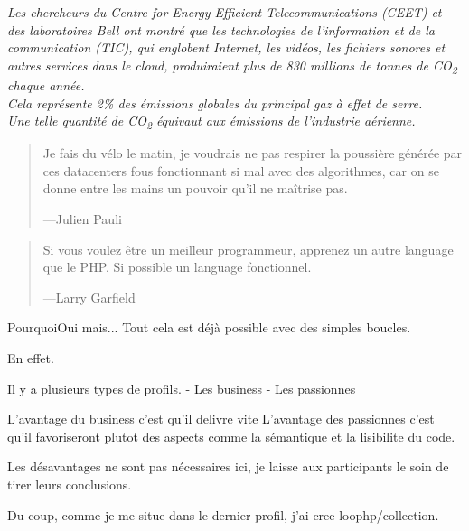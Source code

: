 \begin{frame}
    \begin{center}
        \textit{
            Les chercheurs du Centre for Energy-Efficient Telecommunications (CEET) et des laboratoires Bell ont montré que
            les technologies de l'information et de la communication (TIC), qui englobent Internet, les vidéos, les fichiers sonores
            et autres services dans le cloud, produiraient plus de 830 millions de tonnes de CO\textsubscript{2} chaque année.\\
            Cela représente 2\% des émissions globales du principal gaz à effet de serre.\\
            Une telle quantité de CO\textsubscript{2} équivaut aux émissions de l'industrie aérienne.
        }
    \end{center}

\end{frame}

\begin{frame}
    \begin{quote}
        Je fais du vélo le matin, je voudrais ne pas respirer la poussière générée
        par ces datacenters fous fonctionnant si mal avec des algorithmes,
        car on se donne entre les mains un pouvoir qu'il ne maîtrise pas.

        \begin{flushright}
            \tiny{---Julien Pauli}
        \end{flushright}
    \end{quote}
\end{frame}

\begin{frame}
    \begin{quote}
        Si vous voulez être un meilleur programmeur, apprenez un autre language que
        le PHP. Si possible un language fonctionnel.

        \begin{flushright}
            \tiny{---Larry Garfield}
        \end{flushright}
    \end{quote}
\end{frame}

\begin{frame}{Pourquoi}{Oui mais...}
    Tout cela est déjà possible avec des simples boucles.

    En effet.

    Il y a plusieurs types de profils.
    - Les business
    - Les passionnes

    L'avantage du business c'est qu'il delivre vite
    L'avantage des passionnes c'est qu'il favoriseront plutot
    des aspects comme la sémantique et la lisibilite du code.

    Les désavantages ne sont pas nécessaires ici, je laisse aux
    participants le soin de tirer leurs conclusions.

    Du coup, comme je me situe dans le dernier profil, j'ai cree
    loophp/collection.
\end{frame}


